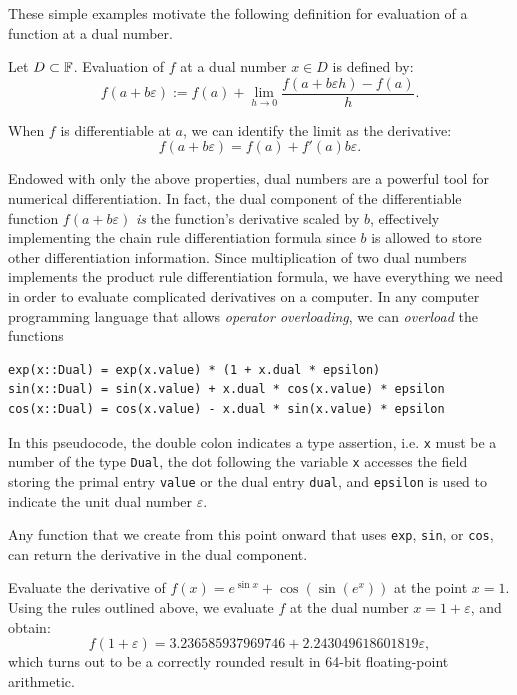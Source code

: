 These simple examples motivate the following definition for evaluation of a function at a dual number.
\begin{definition}
Let $D\subset\mathbb{F}$. Evaluation of $f$ at a dual number $x\in D$ is defined by:
\begin{equation}
f(a+b\varepsilon) := f(a) + \lim_{h\to0}\dfrac{f(a+b\varepsilon h)-f(a)}{h}.
\end{equation}
\end{definition}
When $f$ is differentiable at $a$, we can identify the limit as the derivative:
\[
f(a+b\varepsilon) = f(a) + f'(a)b\varepsilon.
\]

Endowed with only the above properties, dual numbers are a powerful tool for numerical differentiation. In fact, the dual component of the differentiable function $f(a+b\varepsilon)$ {\em is} the function's derivative scaled by $b$, effectively implementing the chain rule differentiation formula since $b$ is allowed to store other differentiation information. Since multiplication of two dual numbers implements the product rule differentiation formula, we have everything we need in order to evaluate complicated derivatives on a computer. In any computer programming language that allows {\em operator overloading}, we can {\em overload} the functions 
\begin{verbatim}
exp(x::Dual) = exp(x.value) * (1 + x.dual * epsilon)
sin(x::Dual) = sin(x.value) + x.dual * cos(x.value) * epsilon
cos(x::Dual) = cos(x.value) - x.dual * sin(x.value) * epsilon
\end{verbatim}
In this pseudocode, the double colon indicates a type assertion, i.e. \verb+x+ must be a number of the type \verb+Dual+, the dot following the variable \verb+x+ accesses the field storing the primal entry \verb+value+ or the dual entry \verb+dual+, and \verb+epsilon+ is used to indicate the unit dual number $\varepsilon$.

Any function that we create from this point onward that uses \verb+exp+, \verb+sin+, or \verb+cos+, can return the derivative in the dual component.

\begin{example}
Evaluate the derivative of $f(x) = e^{\sin x} + \cos(\sin(e^x))$ at the point $x=1$. Using the rules outlined above, we evaluate $f$ at the dual number $x = 1 + \varepsilon$, and obtain:
\[
f(1+\varepsilon) = 3.236585937969746 + 2.243049618601819\varepsilon,
\]
which turns out to be a correctly rounded result in 64-bit floating-point arithmetic.
\end{example}

